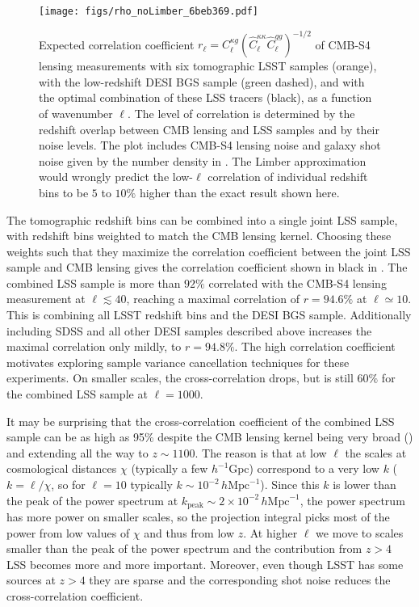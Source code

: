 \documentclass[prd,superscriptaddress,floatfix,notitlepage,nofootinbib,reprint]{revtex4-1} %
\begin{document}
\begin{figure}[tbp]
\texttt{[image: figs/rho\_noLimber\_6beb369.pdf]}
\caption{Expected correlation coefficient $r_\ell=C^{\kappa g}_\ell(\hat C^{\kappa\kappa}_\ell\hat C^{gg}_\ell)^{-1/2}$ of CMB-S4 lensing measurements with six tomographic LSST samples (orange), with the low-redshift DESI BGS sample (green dashed), and with the optimal combination of these LSS tracers (black), as a function of wavenumber $\ell$.
The level of correlation is determined by the redshift overlap between CMB lensing and LSS samples and by their noise levels.
The plot includes CMB-S4 lensing noise and galaxy shot noise given by the number density in .
The Limber approximation would wrongly predict the low-$\ell$ correlation of individual redshift bins to be $5$ to $10\%$ higher than the exact result shown here.
}
\label{fig:rho}
\end{figure}



The tomographic redshift bins can be combined into a single joint LSS sample, with redshift bins weighted to match the CMB lensing kernel.
Choosing these weights such that they maximize the correlation coefficient between the joint LSS sample and CMB lensing \cite{BlakeMarcel1502} gives the correlation coefficient shown in black in .
The combined LSS sample is more than $92\%$ correlated with the CMB-S4 lensing measurement at $\ell\lesssim 40$, reaching a maximal correlation of $r=94.6\%$ at $\ell\simeq 10$.
This is combining all LSST redshift bins and the DESI BGS sample.
Additionally including SDSS and all other DESI samples described above increases the maximal correlation only mildly, to $r=94.8\%$.
The high correlation coefficient motivates exploring sample variance cancellation techniques for these experiments.
On smaller scales, the cross-correlation drops, but is still $60\%$ for the combined LSS sample at $\ell=1000$.

It may be surprising that the cross-correlation coefficient of the combined LSS sample can be as high as 
95\% despite the CMB lensing kernel being very broad () and extending all the way 
to $ z\sim 1100$. The reason is that at low $\ell$ the scales at 
cosmological distances $\chi$ (typically a few $h^{-1}\mathrm{Gpc}$) correspond to a 
very low $k$ ($k=\ell/\chi$, so for $\ell=10$ typically $k \sim 10^{-2}\,h\mathrm{Mpc}^{-1}$). Since this $k$ is lower than the peak of the power spectrum at $k_\mathrm{peak} \sim 2 \times 10^{-2}\,h\mathrm{Mpc}^{-1}$,
 the power spectrum has more power on 
smaller scales, so the projection integral picks most of the power from low 
values of $\chi$ and thus from low $z$. 
At higher $\ell$ we move to scales smaller than the peak 
of the power spectrum and the 
contribution from $z>4$ LSS becomes more and more important. Moreover, 
even though LSST has some sources at $z>4$ they are sparse and the 
corresponding shot noise reduces the cross-correlation coefficient. 
\end{document}
